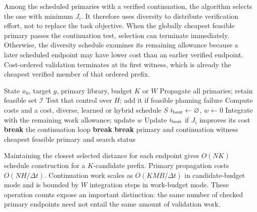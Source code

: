 Among the scheduled primaries with a verified continuation, the algorithm selects the one with minimum $J_i$. It therefore uses diversity to distribute verification effort, not to replace the task objective. When the globally cheapest feasible primary passes the continuation test, selection can terminate immediately. Otherwise, the diversity schedule examines its remaining allowance because a later scheduled endpoint may have lower cost than an earlier verified endpoint. Cost-ordered validation terminates at its first witness, which is already the cheapest verified member of that ordered prefix.

\begin{algorithm}[t]
\caption{Budgeted terminal continuation selection}
\label{alg:search}
\begin{algorithmic}[1]
\Require State $x_0$, target $g$, primary library, budget $K$ or $W$
\State Propagate all primaries; retain feasible set $\mathcal I$
 \State Test that control over $H$; add it if feasible
\EndIf
{}\State \Return planning failure\EndIf
\State Compute costs and a cost, diverse, learned or hybrid schedule $S$
\State $i_{\rm best}\gets\varnothing$, $w\gets0$
  \State Integrate with the remaining work allowance; update $w$
   \State Update $i_{\rm best}$ if $J_i$ improves its cost
   \State \textbf{break} the continuation loop
  \EndIf
  \State \textbf{break}\EndIf
 \EndFor
 \State \textbf{break}
\EndIf
\EndFor
{}\State \Return primary and continuation witness
\Else\State \Return cheapest feasible primary and search status
\EndIf
\end{algorithmic}
\end{algorithm}

Maintaining the closest selected distance for each endpoint gives $O(NK)$ schedule construction for a $K$-candidate prefix. Primary propagation costs $O(NH/\Delta t)$. Continuation work scales as $O(KMB/\Delta t)$ in candidate-budget mode and is bounded by $W$ integration steps in work-budget mode. These operation counts expose an important distinction: the same number of checked primary endpoints need not entail the same amount of validation work.

